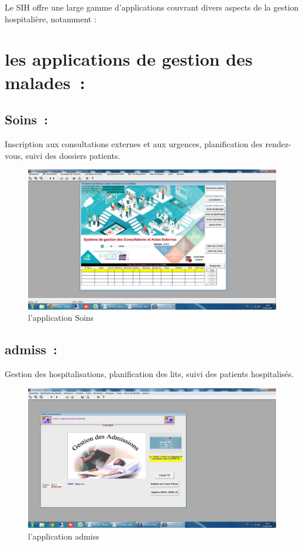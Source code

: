 \documentclass[12pt]{rapportINPTCLOUD}
\begin{document}
	Le SIH offre une large gamme d'applications couvrant divers aspects de la gestion hospitalière, notamment :
	\section{\textcolor{sectioncolor}{les applications de gestion des malades :}}
	\subsection{Soins :} Inscription aux consultations externes et aux urgences, planification des rendez-vous, suivi des dossiers patients.
	\begin{figure}[H]
		\centering
		\includegraphics[width=1\linewidth]{img/a.jpg}
		\caption{l'application Soins}
		\label{fig:Soins}
	\end{figure}	
\newpage
\subsection{admiss :} Gestion des hospitalisations, planification des lits, suivi des patients hospitalisés.
\begin{figure}[H]
\centering
\includegraphics[width=1\linewidth]{img/b.jpg}
\caption{l'application admiss}
\label{fig:admiss}
\end{figure}
\end{document}
